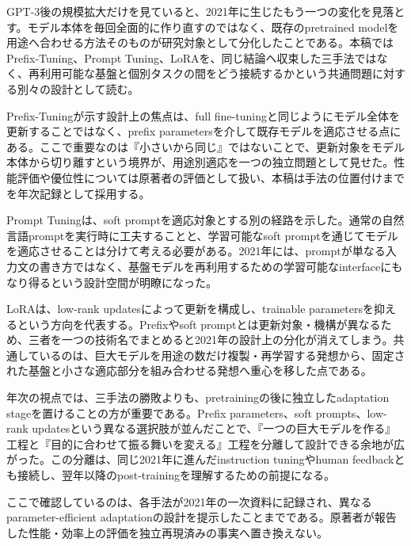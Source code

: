 
GPT-3後の規模拡大だけを見ていると、2021年に生じたもう一つの変化を見落とす。モデル本体を毎回全面的に作り直すのではなく、既存のpretrained modelを用途へ合わせる方法そのものが研究対象として分化したことである。本稿ではPrefix-Tuning、Prompt Tuning、LoRAを、同じ結論へ収束した三手法ではなく、再利用可能な基盤と個別タスクの間をどう接続するかという共通問題に対する別々の設計として読む。\autocite{src-ab9d63ddee6e,src-c1ad400391c9,src-dba095cd4e62}


Prefix-Tuningが示す設計上の焦点は、full fine-tuningと同じようにモデル全体を更新することではなく、prefix parametersを介して既存モデルを適応させる点にある。ここで重要なのは『小さいから同じ』ではないことで、更新対象をモデル本体から切り離すという境界が、用途別適応を一つの独立問題として見せた。性能評価や優位性については原著者の評価として扱い、本稿は手法の位置付けまでを年次記録として採用する。\autocite{src-dba095cd4e62}


Prompt Tuningは、soft promptを適応対象とする別の経路を示した。通常の自然言語promptを実行時に工夫することと、学習可能なsoft promptを通じてモデルを適応させることは分けて考える必要がある。2021年には、promptが単なる入力文の書き方ではなく、基盤モデルを再利用するための学習可能なinterfaceにもなり得るという設計空間が明瞭になった。\autocite{src-c1ad400391c9}


LoRAは、low-rank updatesによって更新を構成し、trainable parametersを抑えるという方向を代表する。Prefixやsoft promptとは更新対象・機構が異なるため、三者を一つの技術名でまとめると2021年の設計上の分化が消えてしまう。共通しているのは、巨大モデルを用途の数だけ複製・再学習する発想から、固定された基盤と小さな適応部分を組み合わせる発想へ重心を移した点である。\autocite{src-ab9d63ddee6e}


年次の視点では、三手法の勝敗よりも、pretrainingの後に独立したadaptation stageを置けることの方が重要である。Prefix parameters、soft prompts、low-rank updatesという異なる選択肢が並んだことで、『一つの巨大モデルを作る』工程と『目的に合わせて振る舞いを変える』工程を分離して設計できる余地が広がった。この分離は、同じ2021年に進んだinstruction tuningやhuman feedbackとも接続し、翌年以降のpost-trainingを理解するための前提になる。\autocite{src-ab9d63ddee6e,src-c1ad400391c9,src-dba095cd4e62}


\begin{claimboundary}
ここで確認しているのは、各手法が2021年の一次資料に記録され、異なるparameter-efficient adaptationの設計を提示したことまでである。原著者が報告した性能・効率上の評価を独立再現済みの事実へ置き換えない。\autocite{src-ab9d63ddee6e,src-c1ad400391c9,src-dba095cd4e62}
\end{claimboundary}
